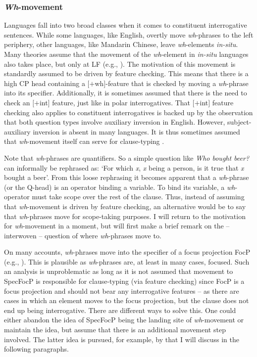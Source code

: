 \subsubsection{\textit{Wh}-movement}
Languages fall into two broad classes when it comes to constituent interrogative sentences. While some languages, like English, overtly move \textit{wh}-phrases to the left periphery, other languages, like Mandarin Chinese, leave \textit{wh}-elements \textit{in-situ}. Many theories assume that the movement of the \textit{wh}-element in \textit{in-situ} languages also takes place, but only at LF (e.g., \citealt{rizzi1990relativized,cheng1997typology}). The motivation of this movement is standardly assumed to be driven by feature checking. This means that there is a high CP head containing a $[+$wh$]$-feature that is checked by moving a \textit{wh}-phrase into its specifier. Additionally, it is sometimes assumed that there is the need to check an $[+$int$]$ feature, just like in polar interrogatives. That $[+$int$]$ feature checking also applies to constituent interrogatives is backed up by the observation that both question types involve auxiliary inversion in English. However, subject-auxiliary inversion is absent in many languages. It is thus sometimes assumed that \textit{wh}-movement itself can serve for clause-typing \citep{cheng1997typology}. 

Note that \textit{wh}-phrases are quantifiers. So a simple question like \textit{Who bought beer?} can informally be rephrased as: `For which \textit{x}, \textit{x} being a person, is it true that \textit{x} bought a beer'. From this loose rephrasing it becomes apparent that a \textit{wh}-phrase (or the Q-head) is an operator binding a variable. To bind its variable, a \textit{wh}-operator must take scope over the rest of the clause. Thus, instead of assuming that \textit{wh}-movement is driven by feature checking, an alternative would be to say that \textit{wh}-phrases move for scope-taking purposes. I will return to the motivation for \textit{wh}-movement in a moment, but will first make a brief remark on the -- interwoven -- question of where \textit{wh}-phrases move to. 

\label{abohpfaua}
On many accounts, \textit{wh}-phrases move into the specifier of a focus projection FocP (e.g., \citealt{rizzi2001position}). This is plausible as \textit{wh}-phrases are, at least in many cases, focused. Such an analysis is unproblematic as long as it is not assumed that movement to SpecFocP is responsible for clause-typing (via feature checking) since FocP is a focus projection and should not bear any interrogative features -- as there are cases in which an element moves to the focus projection, but the clause does not end up being interrogative. There are different ways to solve this. One could either abandon the idea of SpecFocP being the landing site of \textit{wh}-movement or maintain the idea, but assume that there is an additional movement step involved. The latter idea is pursued, for example, by \citet{aboh2010sa} that I will discuss in the following paragraphs.

